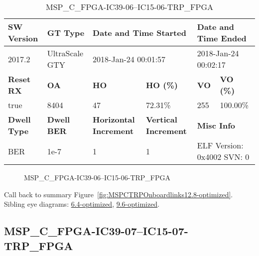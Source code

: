 \begin{table}[h]
\centering
\caption{MSP\_C\_FPGA-IC39-06--IC15-06-TRP\_FPGA}
\label{tab:MSPCFPGAIC3906IC1506TRPFPGA12.8-optimized}
\begin{tabular}{@{}|l|l|l|l|l|l|@{}}
\toprule
\textbf{SW Version}                & \textbf{GT Type}   & \multicolumn{2}{l|}{\textbf{Date and Time Started}}            & \multicolumn{2}{l|}{\textbf{Date and Time Ended}}        \\ \midrule
2017.2                       & UltraScale GTY          & \multicolumn{2}{l|}{2018-Jan-24 00:01:57}                   & \multicolumn{2}{l|}{2018-Jan-24 00:02:17}               \\ \midrule
\textbf{Reset RX}                  & \textbf{OA} & \textbf{HO}   & \textbf{HO (\%)} & \textbf{VO} & \textbf{VO (\%)} \\ \midrule
true & 8404        & 47          & 72.31\%        & 255        & 100.00\%       \\ \midrule
\textbf{Dwell Type}                & \textbf{Dwell BER} & \textbf{Horizontal Increment} & \textbf{Vertical Increment}    & \multicolumn{2}{l|}{\textbf{Misc Info}}                  \\ \midrule
BER                            & 1e-7        & 1        & 1           & \multicolumn{2}{l|}{ELF Version: 0x4002 SVN: 0}                         \\ \bottomrule
\end{tabular}
\end{table}

\begin{figure}[h]
\caption{MSP\_C\_FPGA-IC39-06--IC15-06-TRP\_FPGA} \label{fig:MSPCFPGAIC3906IC1506TRPFPGA12.8-optimized}
\end{figure}

Call back to summary Figure~\ref{fig:MSPCTRPOnboardlinks12.8-optimized}.
Sibling eye diagrams: \hyperref[sec:MSPCFPGAIC3906IC1506TRPFPGA6.4-optimized]{6.4-optimized}, \hyperref[sec:MSPCFPGAIC3906IC1506TRPFPGA9.6-optimized]{9.6-optimized}.

\clearpage
\newpage


\subsection{MSP\_C\_FPGA-IC39-07--IC15-07-TRP\_FPGA}\label{sec:MSPCFPGAIC3907IC1507TRPFPGA12.8-optimized}


